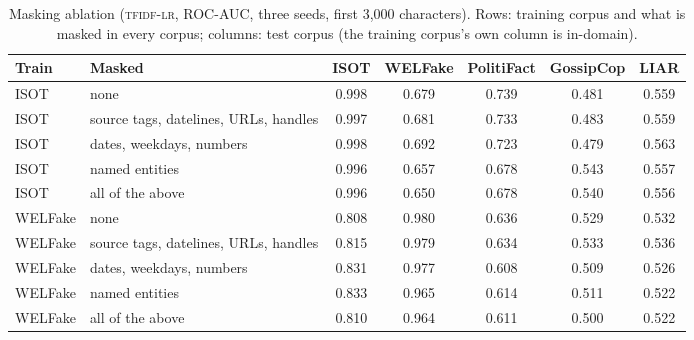 \begin{table}[t]
\centering
\caption{Masking ablation (\textsc{tfidf-lr}, ROC-AUC, three seeds, first 3{,}000 characters). Rows: training corpus and what is masked in every corpus; columns: test corpus (the training corpus's own column is in-domain).}\label{tab:mask}
\small
\begin{tabular}{@{}llccccc@{}}
\toprule
Train & Masked & ISOT & WELFake & PolitiFact & GossipCop & LIAR \\
\midrule
ISOT & none & 0.998 & 0.679 & 0.739 & 0.481 & 0.559 \\
ISOT & source tags, datelines, URLs, handles & 0.997 & 0.681 & 0.733 & 0.483 & 0.559 \\
ISOT & dates, weekdays, numbers & 0.998 & 0.692 & 0.723 & 0.479 & 0.563 \\
ISOT & named entities & 0.996 & 0.657 & 0.678 & 0.543 & 0.557 \\
ISOT & all of the above & 0.996 & 0.650 & 0.678 & 0.540 & 0.556 \\
\addlinespace
WELFake & none & 0.808 & 0.980 & 0.636 & 0.529 & 0.532 \\
WELFake & source tags, datelines, URLs, handles & 0.815 & 0.979 & 0.634 & 0.533 & 0.536 \\
WELFake & dates, weekdays, numbers & 0.831 & 0.977 & 0.608 & 0.509 & 0.526 \\
WELFake & named entities & 0.833 & 0.965 & 0.614 & 0.511 & 0.522 \\
WELFake & all of the above & 0.810 & 0.964 & 0.611 & 0.500 & 0.522 \\
\bottomrule
\end{tabular}
\end{table}
